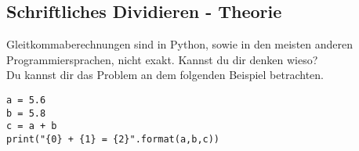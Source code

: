 \subsection{Schriftliches Dividieren - Theorie }
Gleitkommaberechnungen sind in Python, sowie in den meisten anderen Programmiersprachen, nicht exakt. Kannst du dir denken wieso?
\\Du kannst dir das Problem an dem folgenden Beispiel betrachten.
\begin{lstlisting}
a = 5.6
b = 5.8
c = a + b
print("{0} + {1} = {2}".format(a,b,c))
\end{lstlisting}
